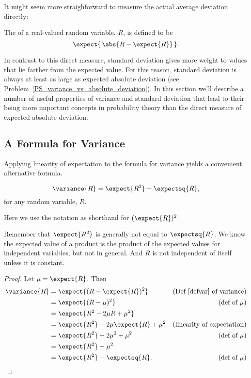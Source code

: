 It might seem more straighforward to measure the actual average
deviation directly:
\begin{definition}\label{def:expabsdev}
The  of a real-valued random
variable, $R$, is defined to be
\[
\expect{\, \abs{R - \expect{R}}\, }.
\]
\end{definition}
In contrast to this direct measure, standard deviation gives more
weight to values that lie farther from the expected value.  For this
reason, standard deviation is always at least as large as expected
absolute deviation (see
Problem~\ref{PS_variance_vs_absolute_deviation}).  In this section
we'll describe a number of useful properties of variance and standard
deviation that lead to their being more important concepts in
probability theory than the direct measure of expected absolute
deviation.

\iffalse
For example, for independent random variables, the variance of a sum
is the sum of the variances; that is, $\variance{R_1 + R_2} =
\variance{R_1} + \variance{R_2}$.  We will prove this fact below.
\fi

\subsection{A Formula for Variance}
Applying linearity of expectation to the formula for variance yields a convenient
alternative formula.
\begin{lemma}\label{alt:var}
\[
\variance{R} = \expect{R^2} - \expectsq{R},
\]
for any random variable, $R$.
\end{lemma}
Here we use the notation  as shorthand for
$(\expect{R})^2$.

\begin{editingnotes}
Remember that $\expect{R^2}$ is generally not equal to $\expectsq{R}$.  We
know the expected value of a product is the product of the expected values
for independent variables, but not in general.  And $R$ is not independent
of itself unless it is constant.

\end{editingnotes}

\begin{proof}
Let $\mu = \expect{R}$.  Then
\begin{align*}
\variance{R} & =   \expect{(R - \expect{R})^2}
               & \text{(Def~\ref{defvar} of variance)}\\
        & = \expect{(R - \mu)^2} & \text{(def of $\mu$)}\\
        & = \expect{R^2 - 2  \mu R + \mu^2} \\
        & = \expect{R^2} - 2 \mu \expect{R} + \mu^2 
                & \text{(linearity of expectation)}\\
        & = \expect{R^2} - 2 \mu^2 + \mu^2
              &  \text{(def of $\mu$)}\\
        & = \expect{R^2} - \mu^2\\
        & = \expect{R^2} - \expectsq{R}.
                  &  \text{(def of $\mu$)}
\end{align*}
\end{proof}

